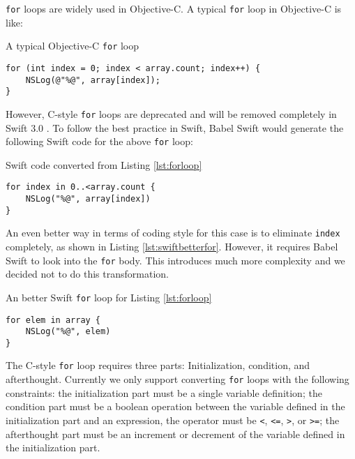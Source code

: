 \documentclass{sfuthesis}
\begin{document}
\texttt{for} loops are widely used in Objective-C. A typical \texttt{for} loop in Objective-C is like:

\begin{listing}[H]
\caption{A typical Objective-C \texttt{for} loop}
\label{lst:forloop}
\begin{verbatim}
for (int index = 0; index < array.count; index++) {
    NSLog(@"%@", array[index]);
}
\end{verbatim}
\end{listing}

However, C-style \texttt{for} loops are deprecated and will be removed completely in Swift 3.0 \cite{removecforloops}. To follow the best practice in Swift, Babel Swift would generate the following Swift code for the above \texttt{for} loop:

\begin{listing}[H]
\caption{Swift code converted from Listing \ref{lst:forloop}}
\begin{verbatim}
for index in 0..<array.count {
    NSLog("%@", array[index])
}
\end{verbatim}
\end{listing}

An even better way in terms of coding style for this case is to eliminate \texttt{index} completely, as shown in Listing \ref{lst:swiftbetterfor}. However, it requires Babel Swift to look into the \texttt{for} body. This introduces much more complexity and we decided not to do this transformation.

\begin{listing}[H]
\caption{An better Swift \texttt{for} loop for Listing \ref{lst:forloop}}
\label{lst:swiftbetterfor}
\begin{verbatim}
for elem in array {
    NSLog("%@", elem)
}
\end{verbatim}
\end{listing}

The C-style \texttt{for} loop requires three parts: Initialization, condition, and afterthought. Currently we only support converting \texttt{for} loops with the following constraints: the initialization part must be a single variable definition; the condition part must be a boolean operation between the variable defined in the initialization part and an expression, the operator must be \texttt{<}, \texttt{<=}, \texttt{>}, or \texttt{>=}; the afterthought part must be an increment or decrement of the variable defined in the initialization part.

%
%
%
\end{document}
